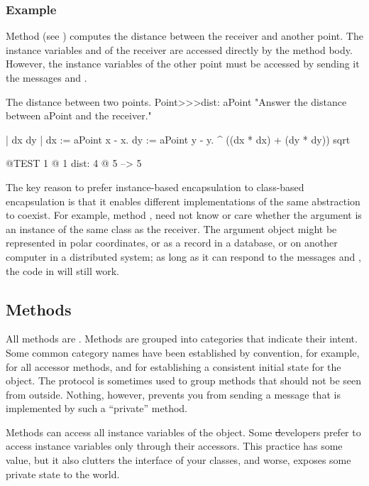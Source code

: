 \documentclass[a4paper,10pt,twoside]{book}
\begin{document}
\subsubsection{Example}
Method  (see ) computes the distance between the receiver and another point.
The instance variables  and  of the receiver are accessed directly by the method body.
However, the instance variables of the other point must be accessed by sending it the messages  and .

\begin{method}[dist:]{The distance between two points.}
Point>>>dist: aPoint
	"Answer the distance between aPoint and the receiver."

	| dx dy |
	dx := aPoint x - x.
	dy :=  aPoint y - y.
	^ ((dx * dx) + (dy * dy)) sqrt
\end{method}

\begin{code}{@TEST}
1 @ 1 dist: 4 @ 5 --> 5
\end{code}

The key reason to prefer instance-based encapsulation to class-based encapsulation is that it enables different implementations of the same abstraction to coexist.
For example, method , need not know or care whether the argument  is an instance of the same class as the receiver.
The argument object might be represented in polar coordinates, or as a record in a database, or on another computer in a distributed system; as long as it can respond to the messages  and , the code in  will still work.

\subsection{Methods}

All methods are .
Methods are grouped into categories that indicate their intent.
Some common category names have been established by convention, for example,  for all accessor methods, and  for establishing a consistent initial state for the object.
The protocol  is sometimes used to group methods that should not be seen from outside.
Nothing, however, prevents you from sending a message that is implemented by such a ``private'' method.

Methods can access all instance variables of the object.
Some \st developers prefer to access instance variables only through their accessors.
This practice has some value, but it also clutters the interface of your classes, and worse, exposes some private state to the world.
\end{document}
